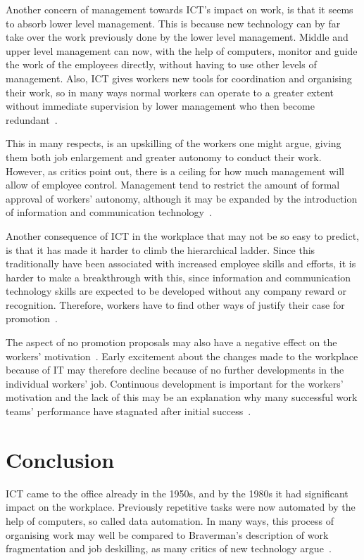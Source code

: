 \documentclass[a4paper,12pt,titlepage]{article}
\begin{document}
  Another concern of management towards ICT's impact on work, is that
  it seems to  absorb lower level management. This is because new technology
  can by far take over the work previously done by the lower level
  management. Middle and upper level management can now, with the
  help of computers, monitor and guide the work of the employees directly,
  without having to use other levels of management. Also, ICT gives
  workers new tools for coordination and organising their work, so
  in many ways normal workers can operate to a greater extent without
  immediate supervision by lower management who then become
  redundant~\cite[128]{jg}.

  This in many respects, is an upskilling of the workers one might argue, giving
  them both job enlargement and greater autonomy to conduct their work.
  However, as critics point out, there is a ceiling for how much
  management will allow of employee control. Management tend to
  restrict the amount of formal approval of workers' autonomy, although
  it may be expanded by the introduction of information and
  communication technology~\cite[152]{brp}.

  Another consequence of ICT in the workplace that may not
  be so easy to predict, is that it has made it harder
  to climb the hierarchical ladder. Since this traditionally
  have been associated with increased employee skills and efforts, it
  is harder to make a breakthrough with this, since information
  and communication technology skills are expected to be developed
  without any company reward or recognition.
  Therefore, workers have to find other
  ways of justify their case for promotion~\cite[133]{jg}.

  The aspect of no promotion proposals may also have a negative
  effect on the workers' motivation~\cite[176]{bbt}. Early excitement
  about the changes made to the workplace because of IT may therefore
  decline because of no further developments in the individual workers'
  job. Continuous development is important for the workers' motivation
  and the lack of this may be an explanation why many
  successful work teams' performance have stagnated after 
  initial success~\cite[301]{sr}.

  \section{Conclusion}
  ICT came to the office already in the 1950s, and by
  the 1980s it had significant impact on the workplace.
  Previously repetitive tasks were now automated
  by the help of computers, so called data automation.
  In many ways, this process of organising work
  may well be compared to Braverman's description
  of work fragmentation and job deskilling, as many critics of
  new technology argue~\cite[24]{jg}.
\end{document}
